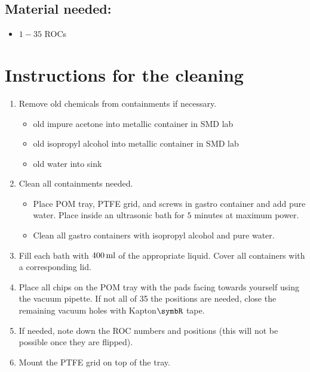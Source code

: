 \begin{appendices}
\subsection*{Material needed:}
\begin{itemize}
\item $1-35$ \ac{ROC}s
\end{itemize}

\section*{Instructions for the cleaning}

\begin{enumerate}
\item Remove old chemicals from containments if necessary.
\begin{itemize}
\item old impure acetone into metallic container in SMD lab
\item old isopropyl alcohol into metallic container in SMD lab
\item old water into sink

\end{itemize}

\item Clean all containments needed.
\begin{itemize}
\item Place \ac{POM} tray, \ac{PTFE} grid, and screws in gastro container and add pure water. Place inside an ultrasonic bath for $5$ minutes at maximum power.
\item Clean all gastro containers with isopropyl alcohol and pure water.
\end{itemize}

\item Fill each bath with $400\,\rm{ml}$ of the appropriate liquid. Cover all containers with a corresponding lid.

\item Place all chips on the \ac{POM} tray with the pads facing towards yourself using the vacuum pipette. If not all of 35 the positions are needed, close the remaining vacuum holes with Kapton$\rm{\symbR}$ tape.

\item If needed, note down the \ac{ROC} numbers and positions (this will not be possible once they are flipped).

\item Mount the \ac{PTFE} grid on top of the tray.


\end{enumerate}
\end{appendices}

